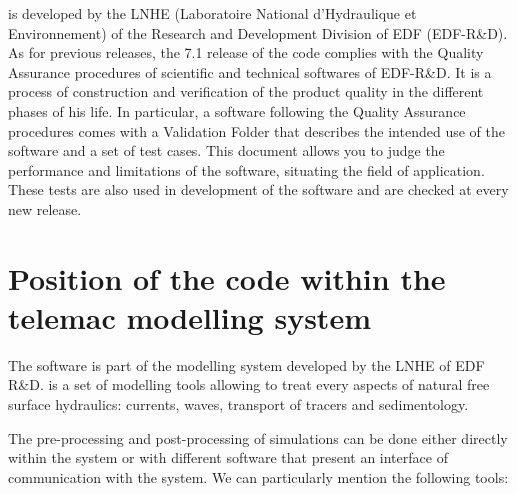  is developed by the LNHE (Laboratoire National d'Hydraulique et
Environnement) of the Research and Development Division of EDF (EDF-R\&D). As
for previous releases, the 7.1 release of the code complies with the Quality
Assurance procedures of scientific and technical softwares of EDF-R\&D. It is a
process of construction and verification of the product quality in the
different phases of his life. In particular, a software following the Quality
Assurance procedures comes with a Validation Folder that describes the intended
use of the software and a set of test cases. This document allows you to judge
the performance and limitations of the software, situating the field of
application. These tests are also used in development of the software and are
checked at every new release.

\section{Position of the  code within the telemac modelling system}

The  software is part of the \tel modelling system developed by
the LNHE of EDF R\&D. \tel is a set of modelling tools allowing to treat
every aspects of natural free surface hydraulics: currents, waves, transport of
tracers and sedimentology.

The pre-processing and post-processing of simulations can be done either
directly within the \tel system or with different software that present an
interface of communication with the system. We can particularly mention the
following tools:

